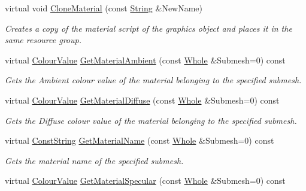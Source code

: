 \begin{DoxyCompactItemize}
\item 
virtual void \hyperlink{classMezzanine_1_1WorldObjectGraphicsSettings_a36002a588b5a0a7494d29f8e7a7a30b1}{CloneMaterial} (const \hyperlink{namespaceMezzanine_acf9fcc130e6ebf08e3d8491aebcf1c86}{String} \&NewName)
\begin{DoxyCompactList}\small\item\em Creates a copy of the material script of the graphics object and places it in the same resource group. \item\end{DoxyCompactList}\item 
virtual \hyperlink{classMezzanine_1_1ColourValue}{ColourValue} \hyperlink{classMezzanine_1_1WorldObjectGraphicsSettings_a7cc74921d09f867ef90f24dea9f86e69}{GetMaterialAmbient} (const \hyperlink{namespaceMezzanine_adcbb6ce6d1eb4379d109e51171e2e493}{Whole} \&Submesh=0) const 
\begin{DoxyCompactList}\small\item\em Gets the Ambient colour value of the material belonging to the specified submesh. \item\end{DoxyCompactList}\item 
virtual \hyperlink{classMezzanine_1_1ColourValue}{ColourValue} \hyperlink{classMezzanine_1_1WorldObjectGraphicsSettings_af8299a94bfc54dc8f1d2f39fd6b485a6}{GetMaterialDiffuse} (const \hyperlink{namespaceMezzanine_adcbb6ce6d1eb4379d109e51171e2e493}{Whole} \&Submesh=0) const 
\begin{DoxyCompactList}\small\item\em Gets the Diffuse colour value of the material belonging to the specified submesh. \item\end{DoxyCompactList}\item 
virtual \hyperlink{namespaceMezzanine_a63cd699ac54b73953f35ec9cfc05e506}{ConstString} \hyperlink{classMezzanine_1_1WorldObjectGraphicsSettings_ac97ab17ac30eb95eac06de39e5e89f2a}{GetMaterialName} (const \hyperlink{namespaceMezzanine_adcbb6ce6d1eb4379d109e51171e2e493}{Whole} \&Submesh=0) const 
\begin{DoxyCompactList}\small\item\em Gets the material name of the specified submesh. \item\end{DoxyCompactList}\item 
virtual \hyperlink{classMezzanine_1_1ColourValue}{ColourValue} \hyperlink{classMezzanine_1_1WorldObjectGraphicsSettings_ad48d0d8471b5310c27b891d5e51b0c7d}{GetMaterialSpecular} (const \hyperlink{namespaceMezzanine_adcbb6ce6d1eb4379d109e51171e2e493}{Whole} \&Submesh=0) const 

\end{DoxyCompactItemize}
